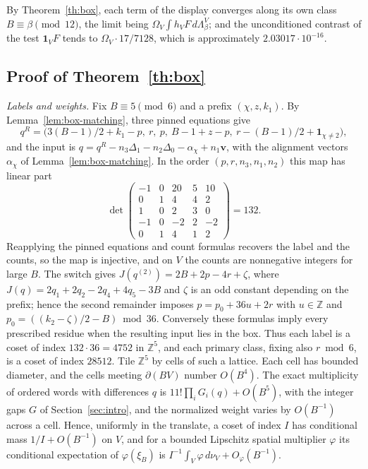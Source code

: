 \documentclass[11pt,reqno]{amsart}
\theoremstyle{remark}
\newcommand{\Z}{\mathbb Z}
\newcommand{\one}{\boldsymbol 1}
\newcommand{\vct}{\boldsymbol v}
\begin{document}
By Theorem~\ref{th:box}, each term of the display converges along its own class \(B\equiv\beta\pmod{12}\), the limit being \(\Omega_V\int h_VF\,d\Lambda^V_\beta\); and the unconditioned contrast of the test \(\one_VF\) tends to \(\Omega_V\cdot17/7128\), which is approximately \(2.03017\cdot10^{-16}\).

\subsection{Proof of Theorem~\ref{th:box}}\label{sec:box-proof}

\emph{Labels and weights.} Fix \(B\equiv5\pmod6\) and a prefix \((\chi,z,k_1)\). By Lemma~\ref{lem:box-matching}, three pinned equations give
\[
 q^R=\bigl(3(B-1)/2+k_1-p,\ r,\ p,\ B-1+z-p,\ r-(B-1)/2+\one_{\chi\ne2}\bigr),
\]
and the input is \(q=q^R-n_3\Delta_1-n_2\Delta_0-\alpha_\chi+n_1\vct\), with the alignment vectors \(\alpha_\chi\) of Lemma~\ref{lem:box-matching}. In the order \((p,r,n_3,n_1,n_2)\) this map has linear part
\[
 \det\begin{pmatrix}
 -1&0&20&5&10\\0&1&4&4&2\\1&0&2&3&0\\-1&0&-2&2&-2\\0&1&4&1&2
 \end{pmatrix}=132.
\]
Reapplying the pinned equations and count formulas recovers the label and the counts, so the map is injective, and on \(V\) the counts are nonnegative integers for large \(B\). The switch gives \(J(q^{(2)})=2B+2p-4r+\zeta\), where \(J(q)=2q_1+2q_2-2q_4+4q_5-3B\) and \(\zeta\) is an odd constant depending on the prefix; hence the second remainder imposes \(p=p_0+36u+2r\) with \(u\in\Z\) and \(p_0=((k_2-\zeta)/2-B)\bmod36\). Conversely these formulas imply every prescribed residue when the resulting input lies in the box. Thus each label is a coset of index \(132\cdot36=4752\) in \(\Z^5\), and each primary class, fixing also \(r\bmod6\), is a coset of index \(28512\). Tile \(\Z^5\) by cells of such a lattice. Each cell has bounded diameter, and the cells meeting \(\partial(BV)\) number \(O(B^4)\). The exact multiplicity of ordered words with differences \(q\) is \(11!\prod_iG_i(q)+O(B^5)\), with the integer gaps \(G\) of Section~\ref{sec:intro}, and the normalized weight varies by \(O(B^{-1})\) across a cell. Hence, uniformly in the translate, a coset of index \(I\) has conditional mass \(1/I+O(B^{-1})\) on \(V\), and for a bounded Lipschitz spatial multiplier \(\varphi\) its conditional expectation of \(\varphi(\xi_B)\) is \(I^{-1}\int_V\varphi\,d\nu_V+O_\varphi(B^{-1})\).
\end{document}
